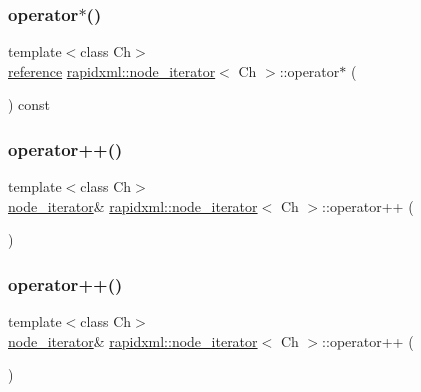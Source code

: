 \subsubsection{\texorpdfstring{operator$\ast$()}{operator*()}\hspace{0.1cm}{\footnotesize\ttfamily [2/2]}}
{\footnotesize\ttfamily template$<$class Ch$>$ \\
\mbox{\hyperlink{classrapidxml_1_1node__iterator_ad7fabbcb7d3d9e4e220299c5475b9e9c}{reference}} \mbox{\hyperlink{classrapidxml_1_1node__iterator}{rapidxml\+::node\+\_\+iterator}}$<$ Ch $>$\+::operator$\ast$ (\begin{DoxyParamCaption}{ }\end{DoxyParamCaption}) const\hspace{0.3cm}{\ttfamily [inline]}}

\mbox{\label{classrapidxml_1_1node__iterator_a8d6b184a76b2ec8a8b5e90bc013c80ed}} 
\subsubsection{\texorpdfstring{operator++()}{operator++()}\hspace{0.1cm}{\footnotesize\ttfamily [1/4]}}
{\footnotesize\ttfamily template$<$class Ch$>$ \\
\mbox{\hyperlink{classrapidxml_1_1node__iterator}{node\+\_\+iterator}}\& \mbox{\hyperlink{classrapidxml_1_1node__iterator}{rapidxml\+::node\+\_\+iterator}}$<$ Ch $>$\+::operator++ (\begin{DoxyParamCaption}{ }\end{DoxyParamCaption})\hspace{0.3cm}{\ttfamily [inline]}}

\mbox{\label{classrapidxml_1_1node__iterator_a8d6b184a76b2ec8a8b5e90bc013c80ed}} 
\subsubsection{\texorpdfstring{operator++()}{operator++()}\hspace{0.1cm}{\footnotesize\ttfamily [2/4]}}
{\footnotesize\ttfamily template$<$class Ch$>$ \\
\mbox{\hyperlink{classrapidxml_1_1node__iterator}{node\+\_\+iterator}}\& \mbox{\hyperlink{classrapidxml_1_1node__iterator}{rapidxml\+::node\+\_\+iterator}}$<$ Ch $>$\+::operator++ (\begin{DoxyParamCaption}{ }\end{DoxyParamCaption})\hspace{0.3cm}{\ttfamily [inline]}}

